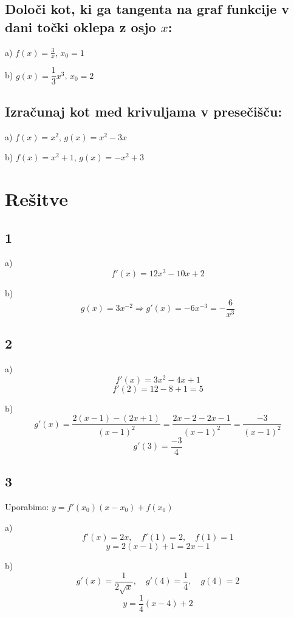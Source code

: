 \documentclass[a4paper,12pt]{article}
\newcounter{tocke}
\newcounter{tocke}
\begin{document}
\subsection{Določi kot, ki ga tangenta na graf funkcije v dani točki oklepa z osjo $x$:}

a) $f(x)=\frac{3}{x}$, \quad $x_0=1$

b) $g(x)=\dfrac{1}{3}x^3$, \quad $x_0=2$


\vspace{1cm}

\def\tockeE{3+3}
\addtocounter{tocke}{\tockeE}
\subsection{Izračunaj kot med krivuljama v presečišču:}

a) $f(x)=x^2$, \quad $g(x)=x^2-3x$

b) $f(x)=x^2+1$, \quad $g(x)=-x^2+3$

\vfill


\newpage

\section*{Rešitve}

\subsection*{1}
a)
\[
f'(x)=12x^3-10x+2
\]

b)
\[
g(x)=3x^{-2} \Rightarrow g'(x)=-6x^{-3}=-\frac{6}{x^3}
\]

\subsection*{2}
a)
\[
f'(x)=3x^2-4x+1
\]
\[
f'(2)=12-8+1=5
\]

b)
\[
g'(x)=\frac{2(x-1)-(2x+1)}{(x-1)^2}
=\frac{2x-2-2x-1}{(x-1)^2}
=\frac{-3}{(x-1)^2}
\]
\[
g'(3)=\frac{-3}{4}
\]

\subsection*{3}
Uporabimo: $y=f'(x_0)(x-x_0)+f(x_0)$

a)
\[
f'(x)=2x,\quad f'(1)=2,\quad f(1)=1
\]
\[
y=2(x-1)+1=2x-1
\]

b)
\[
g'(x)=\frac{1}{2\sqrt{x}},\quad g'(4)=\frac{1}{4},\quad g(4)=2
\]
\[
y=\frac{1}{4}(x-4)+2
\]
\end{document}
